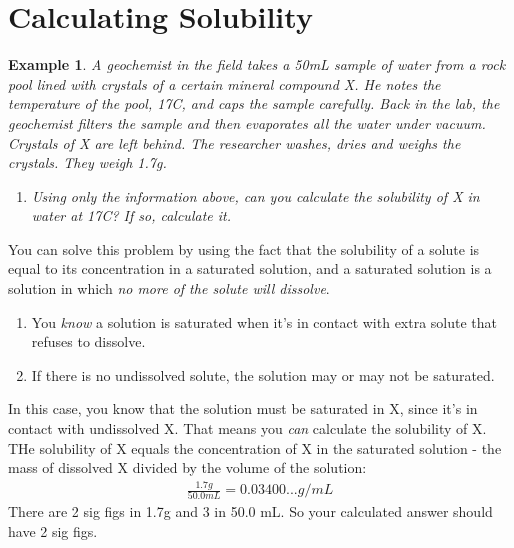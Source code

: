 \documentclass{article}  %
\newtheorem{exmp}{Example}
\begin{document}
\section*{Calculating Solubility}
\begin{exmp}
    A geochemist in the field takes a 50mL sample of water from a rock pool lined with crystals of a certain mineral compound X. He notes the temperature of the pool, 17C, and caps the sample carefully. Back in the lab, the geochemist filters the sample and then evaporates all the water under vacuum. Crystals of X are left behind. The researcher washes, dries and weighs the crystals. They weigh 1.7g.
    \begin{enumerate}
        \item Using only the information above, can you calculate the solubility of X in water at 17C? If so, calculate it.
    \end{enumerate} 
\end{exmp}
You can solve this problem by using the fact that the solubility of a solute is equal to its concentration in a saturated solution, and a saturated solution is a solution in which \emph{no more of the solute will dissolve}.
\begin{enumerate}
    \item You \emph{know} a solution is saturated when it's in contact with extra solute that refuses to dissolve. 
    \item If there is no undissolved solute, the solution may or may not be saturated.
\end{enumerate}
In this case, you know that the solution must be saturated in X, since it's in contact with undissolved X. That means you \emph{can} calculate the solubility of X.
\newline
THe solubility of X equals the concentration of X in the saturated solution - the mass of dissolved X divided by the volume of the solution:
\begin{equation*}
    \begin{aligned}
        \frac{1.7g}{50.0mL} = 0.03400... g/mL
    \end{aligned}
\end{equation*}
There are 2 sig figs in 1.7g and 3 in 50.0 mL. So your calculated answer should have 2 sig figs.
\end{document}
